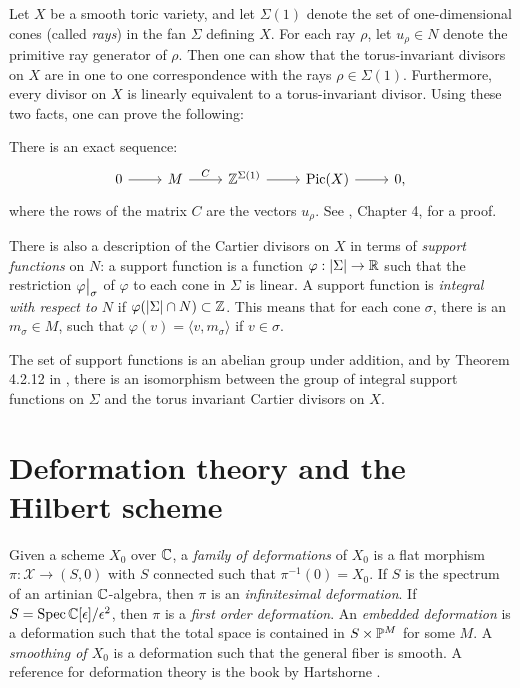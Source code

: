 Let $X$ be a smooth toric variety, and let $\Sigma(1)$ denote the set of one-dimensional cones (called \emph{rays}) in the fan $\Sigma$ defining $X$. For each ray $\rho$, let $u_\rho \in N$ denote the primitive ray generator of $\rho$. Then one can show that the torus-invariant divisors on $X$ are in one to one correspondence with the rays $\rho \in \Sigma(1)$. Furthermore, every divisor on $X$ is linearly equivalent to a torus-invariant divisor. Using these two facts, one can prove the following:

There is an exact sequence:
\[
\begin{tikzcd}
0 \arrow{r} &  M \arrow{r}{C} & \Z^{\Sigma(1)}\arrow{r} & \Pic(X)   \arrow{r} & 0,
\end{tikzcd}
\]
where the rows of the matrix $C$ are the vectors $u_{\rho}$. See \cite{cox_toric}, Chapter 4, for a proof.

There is also a description of the Cartier divisors on $X$ in terms of \emph{support functions} on $N$: a support function is a function $\varphi:|\Sigma| \to \R$ such that the restriction $\restr{\varphi}{\sigma}$ of $\varphi$ to each cone in $\Sigma$ is linear. A support function is \emph{integral with respect to $N$} if $\varphi(|\Sigma| \cap N) \subset \Z$. This means that for each cone $\sigma$, there is an $m_\sigma \in M$, such that $\varphi(v)=\langle v, m_\sigma \rangle$ if $v \in \sigma$.

The set of support functions is an abelian group under addition, and by Theorem 4.2.12 in \cite{cox_toric}, there is an isomorphism between the group of integral support functions on $\Sigma$ and the torus invariant Cartier divisors on $X$.



\section{Deformation theory and the Hilbert scheme}

Given a scheme $X_0$ over $\C$, a \emph{family of deformations} of $X_0$ is a flat morphism $\pi:\mathscr X \to (S,0)$ with $S$ connected such that $\pi^{-1}(0)=X_0$. If $S$ is the spectrum of an artinian $\C$-algebra, then $\pi$ is an \emph{infinitesimal deformation}. If $S=\Spec \C[\epsilon]/\epsilon^2$, then  $\pi$ is a \emph{first order deformation}. An \emph{embedded deformation} is a deformation such that the total space is contained in $S \times \P^M$ for some $M$. A \emph{smoothing of $X_0$} is a deformation such that the general fiber is smooth. A reference for deformation theory is the book by Hartshorne \cite{hartshorne_deformations}.


